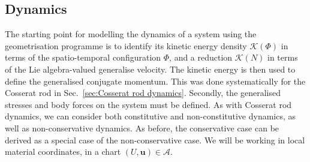 \subsection{Dynamics} \label{sec:(summary) dynamics}

The starting point for modelling the dynamics of a system using the geometrisation programme is to identify its kinetic energy density $\mathcal{K}(\Phi)$ in terms of the spatio-temporal configuration $\Phi$, and a reduction $\mathcal{K}(N)$ in terms of the Lie algebra-valued generalise velocity. The kinetic energy is then used to define the generalised conjugate momentum. This was done systematically for the Cosserat rod in Sec.~\ref{sec:Cosserat rod dynamics}. Secondly, the generalised stresses and body forces on the system must be defined. As with Cosserat rod dynamics, we can consider both constitutive and non-constitutive dynamics, as well as non-conservative dynamics. As before, the conservative case can be derived as a special case of the non-conservative case. We will be working in local material coordinates, in a chart $(U, \mathbf{u}) \in \mathcal{A}$.

